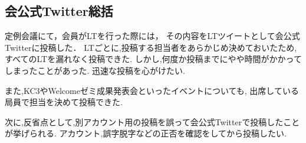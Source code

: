 \subsection*{会公式Twitter総括}



定例会議にて，会員がLTを行った際には，
その内容をLTツイートとして会公式Twitterに投稿した．
LTごとに,投稿する担当者をあらかじめ決めておいたため,
すべてのLTを漏れなく投稿できた.
しかし,何度か投稿までにやや時間がかかってしまったことがあった.
迅速な投稿を心がけたい.

また,KC3やWelcomeゼミ成果発表会といったイベントについても,
出席している局員で担当を決めて投稿できた.

次に,反省点として,別アカウント用の投稿を誤って会公式Twitterで投稿したことが挙げられる.
アカウント,誤字脱字などの正否を確認をしてから投稿したい.
